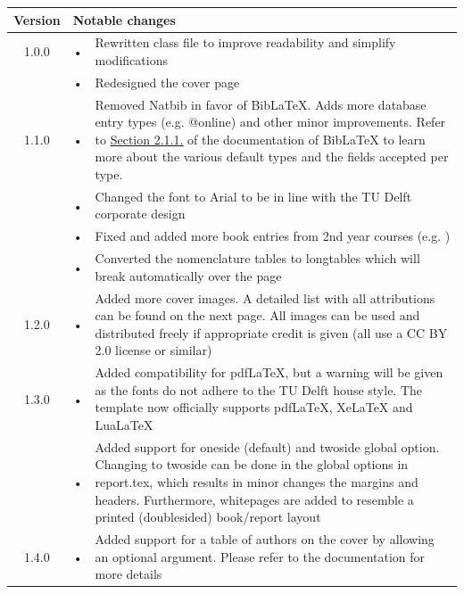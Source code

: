\begin{table}[h]
    \centering
    \begin{tabularx}{0.9\linewidth}{crX}
        \toprule
        Version & \multicolumn{2}{l}{Notable changes} \\
        \midrule
        1.0.0 & • & Rewritten class file to improve readability and simplify modifications \\
        & • & Redesigned the cover page \\
        \midrule
        1.1.0 & • & Removed Natbib in favor of BibLaTeX. Adds more database entry types (e.g. @online) and other minor improvements. Refer to \underline{\href{http://mirrors.ctan.org/macros/latex/contrib/biblatex/doc/biblatex.pdf\#subsubsection.2.1.1}{Section 2.1.1.}} of the documentation of BibLaTeX to learn more about the various default types and the fields accepted per type.\\
        & • & Changed the font to Arial to be in line with the TU Delft corporate design \\
        & • & Fixed and added more book entries from 2nd year courses (e.g. \cite{anderson-fundamentals-of-aerodynamics,megson-aircraft-structures}) \\
        & • & Converted the nomenclature tables to longtables which will break automatically over the page \\
        \midrule
        1.2.0 & • & Added more cover images. A detailed list with all attributions can be found on the next page. All images can be used and distributed freely if appropriate credit is given (all use a CC BY 2.0 license or similar) \\
        \midrule
        1.3.0 & • & Added compatibility for pdfLaTeX, but a warning will be given as the fonts do not adhere to the TU Delft house style. The template now officially supports pdfLaTeX, XeLaTeX and LuaLaTeX \\
        & • & Added support for oneside (default) and twoside global option. Changing to twoside can be done in the global options in report.tex, which results in minor changes the margins and headers. Furthermore, whitepages are added to resemble a printed (doublesided) book/report layout \\
        \midrule
        1.4.0 & • & Added support for a table of authors on the cover by allowing an optional argument. Please refer to the documentation for more details \\
        \bottomrule
    \end{tabularx}
\end{table}

